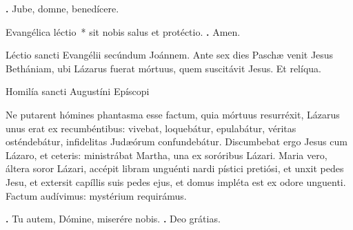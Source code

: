 \begin{small}
\textbf{\Vbar.} Jube, domne, benedícere.

Evangélica léctio~* sit nobis salus et protéctio. \textbf{\Rbar.} Amen.
\end{small}


Léctio sancti Evangélii secúndum Joánnem. 
Ante sex dies Paschæ venit Jesus Bethániam, ubi Lázarus fuerat mórtuus, quem suscitávit Jesus. Et relíqua.


Homilía sancti Augustíni Epíscopi

Ne putarent hómines phantasma esse factum, quia mórtuus resurréxit, Lázarus unus erat ex recumbéntibus: vivebat, loquebátur, epulabátur, véritas osténdebátur, infidelitas Judæórum confundebátur. Discumbebat ergo Jesus cum Lázaro, et ceteris: ministrábat Martha, una ex soróribus Lázari. Maria vero, áltera soror Lázari, accépit libram unguénti nardi pístici pretiósi, et unxit pedes Jesu, et extersit capíllis suis pedes ejus, et domus impléta est ex odore unguenti. Factum audívimus: mystérium requirámus.

\textbf{\Vbar.} Tu autem, Dómine, miserére nobis.
\textbf{\Rbar.} Deo grátias.

